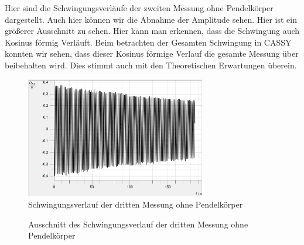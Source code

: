\documentclass[twoside]{protokoll}
\begin{document}
Hier sind die Schwingungsverläufe der zweiten Messung ohne Pendelkörper dargestellt. 
Auch hier können wir die Abnahme der Amplitude sehen.
Hier ist ein größerer Ausschnitt zu sehen. Hier kann man erkennen, dass die Schwingung auch Kosinus förmig Verläuft. 
Beim betrachten der Gesamten Schwingung in CASSY konnten wir sehen, dass dieser Kosinus förmige Verlauf die gesamte Messung über beibehalten wird.
Dies stimmt auch mit den Theoretischen Erwartungen überein.

\begin{figure}[H]
    \centering
    \includegraphics[width=0.7\textwidth]{plots/stange-3-komplett.pdf}
    \caption{Schwingungsverlauf der dritten Messung ohne Pendelkörper}
\end{figure}
\begin{figure}[H]
    \centering
    \hfill
    \caption{Ausschnitt des Schwingungsverlauf der dritten Messung ohne Pendelkörper}
\end{figure}
\end{document}
